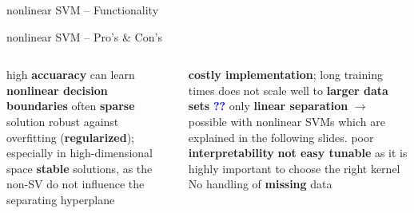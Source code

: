 \begin{frame}{nonlinear SVM -- Functionality}
\end{frame}


\setdraft

\begin{frame}{nonlinear SVM -- Pro's \& Con's}

\footnotesize

\begin{columns}[onlytextwidth]
  \begin{column}{0.5\textwidth}
    \footnotesize
    \begin{itemize}
      \positem high \textbf{accuaracy}
      \positem can learn \textbf{nonlinear decision boundaries}
      \positem often \textbf{sparse} solution
      \positem robust against overfitting (\textbf{regularized}); especially in high-dimensional space 
      \positem \textbf{stable} solutions, as the non-SV do not influence the separating hyperplane
    \end{itemize}
  \end{column}

  \begin{column}{0.5\textwidth}
    \footnotesize
    \begin{itemize}
      \negitem \textbf{costly implementation}; long training times
      \negitem does not scale well to \textbf{larger data sets} \textcolor{blue}{\textbf{??}}
      \negitem only \textbf{linear separation} $\rightarrow$ possible 
      with nonlinear SVMs which are explained in the following slides.
      \negitem poor \textbf{interpretability}
      \negitem \textbf{not easy tunable} as it is highly important to choose the right kernel
      \negitem No handling of \textbf{missing} data
      
    \end{itemize}
  \end{column}
\end{columns}

\vfill

\small


\end{frame}

\undraft

